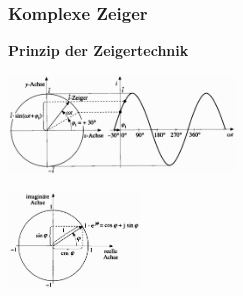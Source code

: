 		\subsubsection{Komplexe Zeiger}
			\begin{minipage}[t]{6cm}
            	\textbf{Prinzip der Zeigertechnik}
            \end{minipage}
			\begin{minipage}{6cm}
            	\includegraphics[width=6cm]{bilder/RotierenderScheitelwertzeiger.png}
            \end{minipage}
			\begin{minipage}{3.5cm}
            	\includegraphics[width=3.5cm]{bilder/EulerscheRelation.png}
            \end{minipage} \\
